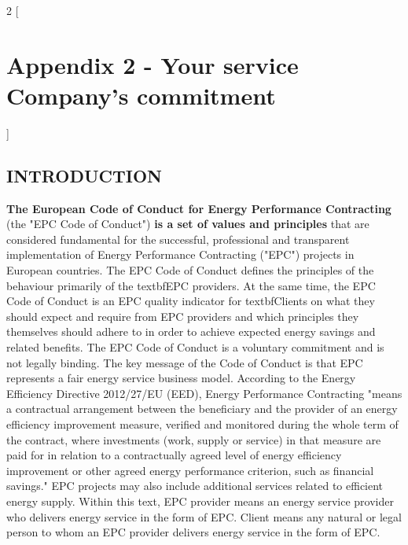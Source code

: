 \begin{multicols}{2}
[\section{Appendix 2 {-} Your service Company’s commitment}]

\subsection{INTRODUCTION}
\textbf{The European Code of Conduct for Energy Performance Contracting} (the "EPC Code
of Conduct") \textbf{is a set of values and principles} that are considered fundamental
for the successful, professional and transparent implementation of Energy
Performance Contracting ("EPC") projects in European countries.
The EPC Code of Conduct defines the principles of the behaviour primarily of
the textbf{EPC} providers. At the same time, the EPC Code of Conduct is an EPC quality
indicator for textbf{Clients} on what they should expect and require from EPC providers
and which principles they themselves should adhere to in order to achieve
expected energy savings and related benefits.
The EPC Code of Conduct is a voluntary commitment and is not legally binding.
The key message of the Code of Conduct is that EPC represents a fair energy
service business model.
According to the Energy Efficiency Directive 2012/27/EU (EED), Energy
Performance Contracting "means a contractual arrangement between the
beneficiary and the provider of an energy efficiency improvement measure,
verified and monitored during the whole term of the contract, where investments
(work, supply or service) in that measure are paid for in relation to a
contractually agreed level of energy efficiency improvement or other agreed
energy performance criterion, such as financial savings." EPC projects may also
include additional services related to efficient energy supply.
Within this text, EPC provider means an energy service provider who delivers
energy service in the form of EPC. Client means any natural or legal person to
whom an EPC provider delivers energy service in the form of EPC.


\end{multicols}
